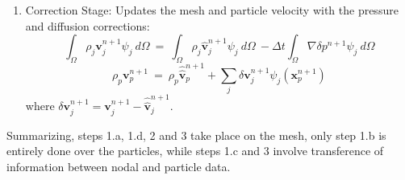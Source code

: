 \begin{enumerate}
  \item Correction Stage: Updates the mesh and particle velocity with the pressure and diffusion corrections:
    \begin{equation}\label{Step6a}
      \int_{\Omega} \rho_j \mathbf{v}_j^{n+1}\psi_j\ d\Omega \ = \ \int_{\Omega} \rho_j  \widehat{\mathbf{v}}_j^{n+1}\psi_j\ d\Omega\ - \Delta t \int_{\Omega}  \nabla \delta p^{n+1}\psi_j\ d\Omega
    \end{equation}
    \begin{equation}\label{Step6b}
    \rho_p \mathbf{v}_p^{n+1}\  = \ \rho_p \widehat{\widehat{\mathbf{v}}}_p^{n+1} + \sum_{j} \delta \mathbf{v}_j^{n+1} \psi_j(\mathbf{x}_{p}^{n+1})
    \end{equation}
    where $\delta \mathbf{v}_j^{n+1} = \mathbf{v}_j^{n+1}-\widehat{\widehat{\mathbf{v}}}_j^{n+1}$.

\end{enumerate}

Summarizing, steps 1.a, 1.d, 2 and 3 take place on the mesh, only step 1.b is entirely done over the particles, while steps 1.c and 3 involve transference of information between nodal and particle data.
